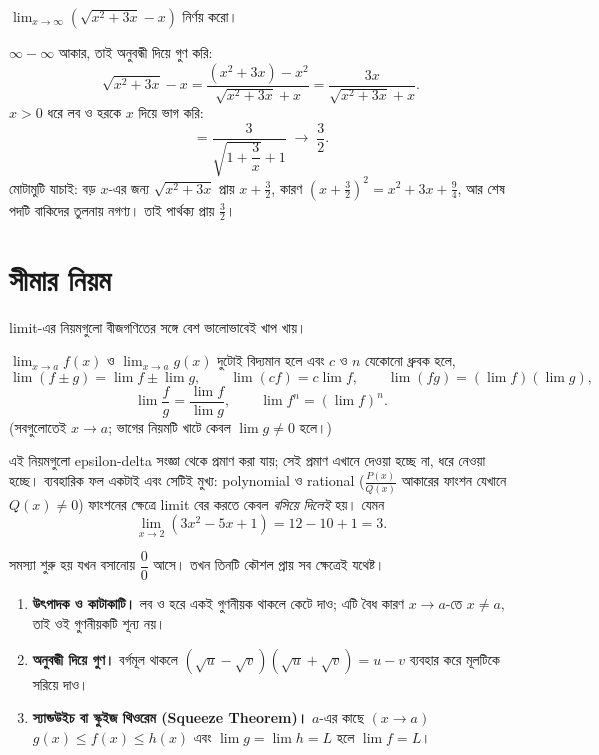 \documentclass[11pt]{article}
\begin{document}
 $\lim_{x \to \infty} \left( \sqrt{x^{2}+3x} - x \right)$ নির্ণয় করো।

\begin{sol}
$\infty - \infty$ আকার, তাই অনুবন্ধী দিয়ে গুণ করি:
\[
  \sqrt{x^{2}+3x} - x
  = \frac{\left( x^{2}+3x \right) - x^{2}}{\sqrt{x^{2}+3x}+x}
  = \frac{3x}{\sqrt{x^{2}+3x}+x} .
\]
$x > 0$ ধরে লব ও হরকে $x$ দিয়ে ভাগ করি:
\[
  = \frac{3}{\sqrt{1+\dfrac{3}{x}} + 1}
  \;\longrightarrow\; \frac{3}{2} .
\]
মোটামুটি যাচাই: বড় $x$-এর জন্য $\sqrt{x^{2}+3x}$ প্রায় $x + \tfrac{3}{2}$,
কারণ $\left( x + \tfrac{3}{2} \right)^{2} = x^{2} + 3x + \tfrac{9}{4}$, আর
শেষ পদটি বাকিদের তুলনায় নগণ্য। তাই পার্থক্য প্রায় $\tfrac{3}{2}$।
\end{sol}

\section{সীমার নিয়ম}

limit-এর নিয়মগুলো বীজগণিতের সঙ্গে বেশ ভালোভাবেই খাপ খায়।

\begin{idea}[Limit-এর নিয়ম]
$\lim_{x \to a} f(x)$ ও $\lim_{x \to a} g(x)$ দুটোই বিদ্যমান হলে এবং $c$ ও $n$ যেকোনো ধ্রুবক হলে,
\[
  \lim (f \pm g) = \lim f \pm \lim g, \qquad
  \lim (cf) = c \lim f, \qquad
  \lim (fg) = \left( \lim f \right)\left( \lim g \right) ,
\]
\[
  \lim \frac{f}{g} = \frac{\lim f}{\lim g}, \qquad
  \lim f^{n} = \left( \lim f \right)^{n} .
\]
(সবগুলোতেই $x \to a$; ভাগের নিয়মটি খাটে কেবল $\lim g \neq 0$ হলে।)
\end{idea}

এই নিয়মগুলো epsilon-delta সংজ্ঞা থেকে প্রমাণ করা যায়; সেই প্রমাণ এখানে দেওয়া
হচ্ছে না, ধরে নেওয়া হচ্ছে। ব্যবহারিক ফল একটাই এবং সেটিই মুখ্য: polynomial ও
rational ($\frac{P(x)}{Q(x)}$ আকারের ফাংশন যেখানে $Q(x)\ne 0$) ফাংশনের ক্ষেত্রে limit বের করতে কেবল
\emph{বসিয়ে দিলেই} হয়। যেমন
\[
  \lim_{x \to 2} \left( 3x^{2} - 5x + 1 \right) = 12 - 10 + 1 = 3 .
\]

সমস্যা শুরু হয় যখন বসানোয় $\dfrac{0}{0}$ আসে। তখন তিনটি কৌশল প্রায় সব
ক্ষেত্রেই যথেষ্ট।

\begin{idea}[$0/0$ ভাঙার তিন কৌশল]
\begin{enumerate}
  \item \textbf{উৎপাদক ও কাটাকাটি।} লব ও হরে একই গুণনীয়ক থাকলে কেটে দাও; এটি
        বৈধ কারণ $x \to a$-তে $x \neq a$, তাই ওই গুণনীয়কটি শূন্য নয়।
  \item \textbf{অনুবন্ধী দিয়ে গুণ।} বর্গমূল থাকলে
        $(\sqrt{u}-\sqrt{v})(\sqrt{u}+\sqrt{v}) = u-v$ ব্যবহার করে মূলটিকে
        সরিয়ে দাও।
  \item \textbf{স্যান্ডউইচ বা স্কুইজ থিওরেম (Squeeze Theorem)।} $a$-এর কাছে $(x\xrightarrow{}a)$
        $g(x) \leq f(x) \leq h(x)$ এবং
        $\lim g = \lim h = L$ হলে $\lim f = L$।
\end{enumerate}
\end{idea}
\end{document}
